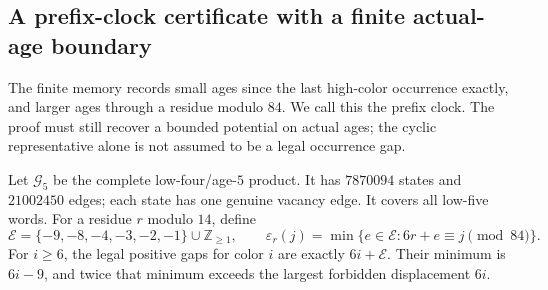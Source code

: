 \documentclass[11pt,reqno]{amsart}
\theoremstyle{plain}
\theoremstyle{plain}
\theoremstyle{plain}
\begin{document}
\subsection{A prefix-clock certificate with a finite actual-age boundary}
\label{S-supp:cr-prefix-clock}

The finite memory records small ages since the last high-color occurrence
exactly, and larger ages through a residue modulo $84$. We call this the prefix clock. The proof must still recover
a bounded potential on actual ages; the cyclic representative alone is not
assumed to be a legal occurrence gap.



Let $\mathcal G_5$ be the complete low-four/age-$5$ product. It has
$7870094$ states and $21002450$ edges; each state has one genuine
vacancy edge. It covers all low-five words. For a residue $r$ modulo
$14$, define
\[
 \mathcal E=\{-9,-8,-4,-3,-2,-1\}\cup\mathbb Z_{\ge1},\qquad
 \varepsilon_r(j)=\min\{e\in\mathcal E:6r+e\equiv j\pmod {84}\}.
\]
For $i\ge6$, the legal positive gaps for color $i$ are exactly
$6i+\mathcal E$. Their minimum is $6i-9$, and twice that minimum
exceeds the largest forbidden displacement $6i$.
\end{document}
